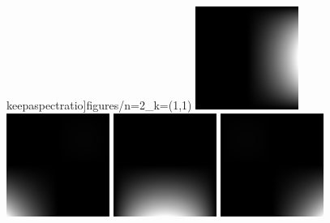 \documentclass[11pt, a4paper]{article}
\begin{document}
\begin{figure}[htbp]
  keepaspectratio]{figures/n=2_k=(1,1)}
  \includegraphics[width=0.3\textwidth, height=\textheight,
  keepaspectratio]{figures/n=2_k=(1,2)}
  \includegraphics[width=0.3\textwidth, height=\textheight,
  keepaspectratio]{figures/n=2_k=(2,0)}
  \includegraphics[width=0.3\textwidth, height=\textheight,
  keepaspectratio]{figures/n=2_k=(2,1)}
  \includegraphics[width=0.3\textwidth, height=\textheight,
  keepaspectratio]{figures/n=2_k=(2,2)}
  \caption{}
  \label{fig:lagrange-shape-functions}
\end{figure}
\end{document}

